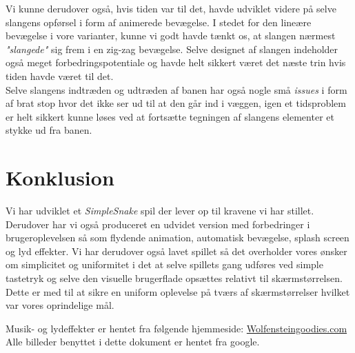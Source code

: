 \documentclass[]{article}
\begin{document}
	Vi kunne derudover også, hvis tiden var til det, havde udviklet videre på selve slangens opførsel i form af animerede bevægelse. I stedet for den lineære bevægelse i vore varianter, kunne vi godt havde tænkt os, at slangen nærmest \textit{"slangede"} sig frem i en zig-zag bevægelse. Selve designet af slangen indeholder også meget forbedringspotentiale og havde helt sikkert været det næste trin hvis tiden havde været til det. \\
	
	Selve slangens indtræden og udtræden af banen har også nogle små \textit{issues} i form af brat stop hvor det ikke ser ud til at den går ind i væggen, igen et tidsproblem er helt sikkert kunne løses ved at fortsætte tegningen af slangens elementer et stykke ud fra banen.
	
	
	\section{Konklusion}
	
	Vi har udviklet et \textit{SimpleSnake} spil der lever op til kravene vi har stillet. Derudover har vi også produceret en udvidet version med forbedringer i brugeroplevelsen så som flydende animation, automatisk bevægelse, splash screen og lyd effekter. 
	Vi har derudover også lavet spillet så det overholder vores ønsker om simplicitet og uniformitet i det at selve spillets gang udføres ved simple tastetryk og selve den visuelle brugerflade opsættes relativt til skærmstørrelsen. Dette er med til at sikre en uniform oplevelse på tværs af skærmstørrelser hvilket var vores oprindelige mål. 
	
	\begin{thebibliography}{2}
		Musik- og lydeffekter er hentet fra følgende hjemmeside: \href{http://www.wolfensteingoodies.com/archives/olddoom/music.htm}{Wolfensteingoodies.com}
		Alle billeder benyttet i dette dokument er hentet fra google.
	\end{thebibliography}
	
\end{document}
